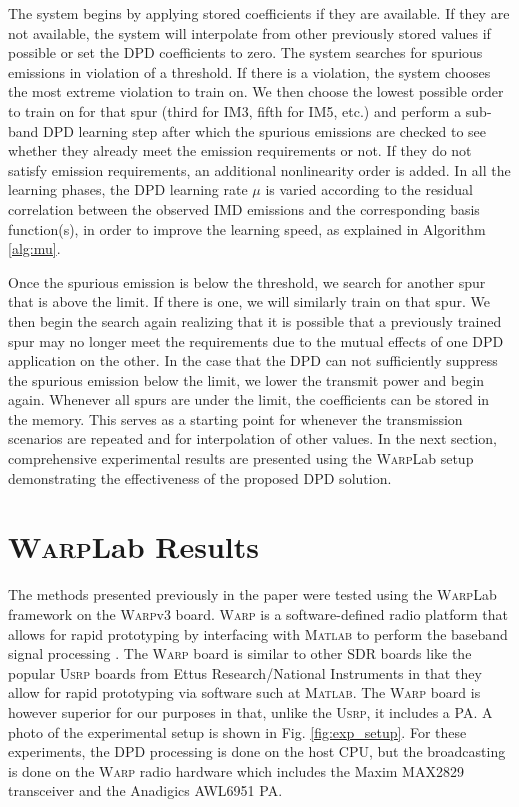 The system begins by applying stored coefficients if they are available. 
If they are not available, the system will interpolate from other previously stored values if possible or set the DPD coefficients to zero. 
The system searches for spurious emissions in violation of a threshold. 
If there is a violation, the system chooses the most extreme violation to train on. 
We then choose the lowest possible order to train on for that spur (third for IM3, fifth for IM5, etc.) and perform a sub-band DPD learning step after which the spurious emissions are checked to see whether they already meet the emission requirements or not. 
If they do not satisfy emission requirements, an additional nonlinearity order is added. 
In all the learning phases, the DPD learning rate $\mu$ is varied according to the residual correlation between the observed IMD emissions and the corresponding basis function(s), in order to improve the learning speed, as explained in Algorithm \ref{alg:mu}. 

Once the spurious emission is below the threshold, we search for another spur that is above the limit. If there is one, we will similarly train on that spur. We then begin the search again realizing that it is possible that a previously trained spur may no longer meet the requirements due to the mutual effects of one DPD application on the other. In the case that the DPD can not sufficiently suppress the spurious emission below the limit, we lower the transmit power and begin again. Whenever all spurs are under the limit, the coefficients can be stored in the memory.
This serves as a starting point for whenever the transmission scenarios are repeated and for interpolation of other values. 
In the next section, comprehensive experimental results are presented using the \textsc{Warp}Lab setup demonstrating the effectiveness of the proposed DPD solution.

\section{\textsc{Warp}Lab Results}
\label{sec:WARPLabResults}
The methods presented previously in the paper were tested using the \textsc{Warp}Lab framework on the \textsc{Warp}v3 board. 
\textsc{Warp} is a software-defined radio platform that allows for rapid prototyping by interfacing with \textsc{Matlab} to perform the baseband signal processing  \cite{warpProject}. 
{\color{red} The \textsc{Warp} board is similar to other SDR boards like the popular \textsc{Usrp} boards from Ettus Research/National Instruments in that they allow for rapid prototyping via software such at \textsc{Matlab}. The \textsc{Warp} board is however superior for our purposes in that, unlike the \textsc{Usrp}, it includes a PA.}
A photo of the experimental setup is shown in Fig. \ref{fig:exp_setup}. 
For these experiments, the DPD processing is done on the host CPU, but the broadcasting is done on the \textsc{Warp} radio hardware which includes the Maxim MAX2829 transceiver and the Anadigics AWL6951 PA.

